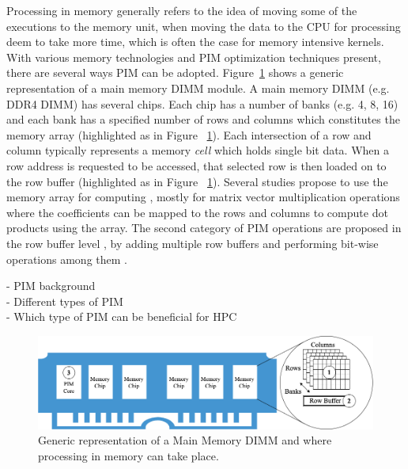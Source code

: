 Processing in memory generally refers to the idea of moving some of the executions to the memory unit, when moving the data to the CPU for processing deem to take more time, which is often the case for memory intensive kernels. With various memory technologies and PIM optimization techniques present, there are several ways PIM can be adopted. Figure~\ref{fig:pimcat} shows a generic representation of a main memory DIMM module. A main memory DIMM (e.g. DDR4 DIMM) has several chips. Each chip has a number of banks (e.g. 4, 8, 16) and each bank has a specified number of rows and columns which constitutes the memory array (highlighted as  in Figure ~\ref{fig:pimcat}). Each intersection of a row and column typically represents a memory \textit{cell} which holds single bit data. When a row address is requested to be accessed, that selected row is then loaded on to the row buffer (highlighted as  in Figure ~\ref{fig:pimcat}). Several studies propose to use the memory array  for computing \cite{03,06,13,15,20,29,54,55,58}, mostly for matrix vector multiplication operations where the coefficients can be mapped to the rows and columns to compute dot products using the array. The second category of PIM operations are proposed in the row buffer level , by adding multiple row buffers and performing bit-wise operations among them \cite{}.       







-	PIM background \\
-	Different types of PIM \\
-	Which type of PIM can be beneficial for HPC \\


\begin{figure}[t!]
\centering
\includegraphics[width=\columnwidth]{MEMSYS22/figures/pimcat.png}
\caption{Generic representation of a Main Memory DIMM and where processing in memory can take place.}
\label{fig:pimcat}
\end{figure}   


  